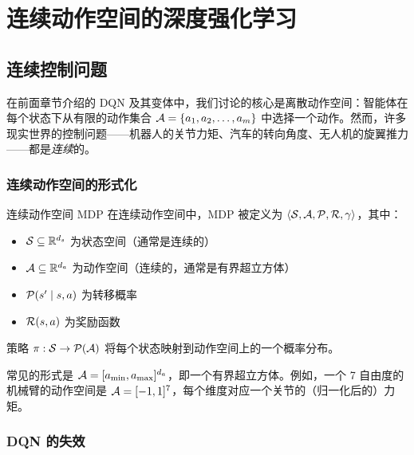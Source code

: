 
\chapter{连续动作空间的深度强化学习}


\section{连续控制问题}

在前面章节介绍的 DQN 及其变体中，我们讨论的核心是离散动作空间：智能体在每个状态下从有限的动作集合 $\mathcal{A} = \{a_1, a_2, \dots, a_m\}$ 中选择一个动作。然而，许多现实世界的控制问题——机器人的关节力矩、汽车的转向角度、无人机的旋翼推力——都是\emph{连续}的。

\subsection{连续动作空间的形式化}

\begin{mydefinition}{连续动作空间 MDP}
在连续动作空间中，MDP 被定义为 $\langle \mathcal{S}, \mathcal{A}, \mathcal{P}, \mathcal{R}, \gamma \rangle$，其中：

\begin{itemize}
    \item $\mathcal{S} \subseteq \mathbb{R}^{d_s}$ 为状态空间（通常是连续的）
    \item $\mathcal{A} \subseteq \mathbb{R}^{d_a}$ 为动作空间（连续的，通常是有界超立方体）
    \item $\mathcal{P}(s' \mid s, a)$ 为转移概率
    \item $\mathcal{R}(s, a)$ 为奖励函数
\end{itemize}

策略 $\pi: \mathcal{S} \to \mathcal{P}(\mathcal{A})$ 将每个状态映射到动作空间上的一个概率分布。
\end{mydefinition}

常见的形式是 $\mathcal{A} = [a_{\min}, a_{\max}]^{d_a}$，即一个有界超立方体。例如，一个 7 自由度的机械臂的动作空间是 $\mathcal{A} = [-1, 1]^7$，每个维度对应一个关节的（归一化后的）力矩。

\subsection{DQN 的失效}

